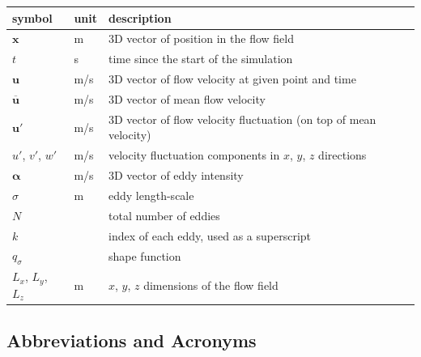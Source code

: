 \documentclass[12pt]{article}
\begin{document}
\renewcommand{\arraystretch}{1.2}
\noindent \begin{longtable*}{l l p{12cm}} \toprule
\textbf{symbol} & \textbf{unit} & \textbf{description}\\
\midrule 
$\mathbf{x}$ & \si{\metre} & 3D vector of position in the flow field
\\
$t$ & \si{\second} & time since the start of the simulation
\\
$\mathbf{u}$ & \si[per-mode=symbol] {\metre\per\second} & 3D vector of flow velocity at given point and time
\\
$\mathbf{\overline{u}}$ & \si[per-mode=symbol] {\metre\per\second} & 3D vector of mean flow velocity
\\
$\mathbf{u'}$ & \si[per-mode=symbol] {\metre\per\second} & 3D vector of flow velocity fluctuation (on top of mean velocity)
\\
$u'$, $v'$, $w'$ & \si[per-mode=symbol] {\metre\per\second} & velocity fluctuation components in $x$, $y$, $z$ directions
\\
$\boldsymbol{\alpha}$ & \si[per-mode=symbol] {\metre\per\second} & 3D vector of eddy intensity
\\
$\sigma$ & \si{\metre} & eddy length-scale
\\ 
$N$ &  & total number of eddies
\\ 
$k$ &  & index of each eddy, used as a superscript
\\
$q_\sigma$ &  & shape function
\\
$L_x$, $L_y$, $L_z$ & \si{\metre} & $x$, $y$, $z$ dimensions of the flow field
\\
\bottomrule
\end{longtable*}

\subsection{Abbreviations and Acronyms}
\end{document}
